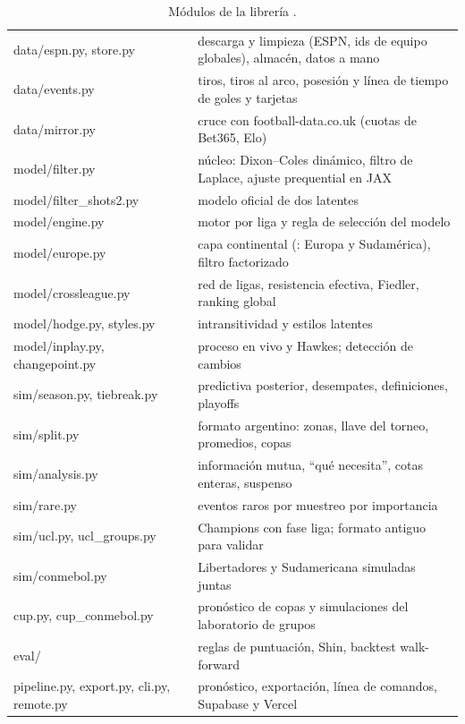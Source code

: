 \begin{table}[h]
\centering
\caption{Módulos de la librería .}
\label{tab:modulos}
\small
\begin{tabularx}{\textwidth}{@{}>{\ttfamily\small}p{4.6cm}L@{}}
\toprule
{} &  \\
\midrule
data/espn.py, store.py & descarga y limpieza (ESPN, ids de equipo globales), almacén, datos a mano \\
data/events.py & tiros, tiros al arco, posesión y línea de tiempo de goles y tarjetas \\
data/mirror.py & cruce con football-data.co.uk (cuotas de Bet365, Elo) \\
model/filter.py & núcleo: Dixon–Coles dinámico, filtro de Laplace, ajuste prequential en JAX \\
model/filter\_shots2.py & modelo oficial de dos latentes \\
model/engine.py & motor por liga y regla de selección del modelo \\
model/europe.py & capa continental (: Europa y Sudamérica), filtro factorizado \\
model/crossleague.py & red de ligas, resistencia efectiva, Fiedler, ranking global \\
model/hodge.py, styles.py & intransitividad y estilos latentes \\
model/inplay.py, changepoint.py & proceso en vivo y Hawkes; detección de cambios \\
sim/season.py, tiebreak.py & predictiva posterior, desempates, definiciones, playoffs \\
sim/split.py & formato argentino: zonas, llave del torneo, promedios, copas \\
sim/analysis.py & información mutua, ``qué necesita'', cotas enteras, suspenso \\
sim/rare.py & eventos raros por muestreo por importancia \\
sim/ucl.py, ucl\_groups.py & Champions con fase liga; formato antiguo para validar \\
sim/conmebol.py & Libertadores y Sudamericana simuladas juntas \\
cup.py, cup\_conmebol.py & pronóstico de copas y simulaciones del laboratorio de grupos \\
eval/ & reglas de puntuación, Shin, backtest walk-forward \\
pipeline.py, export.py, cli.py, remote.py & pronóstico, exportación, línea de comandos, Supabase y Vercel \\
\bottomrule
\end{tabularx}
\end{table}

